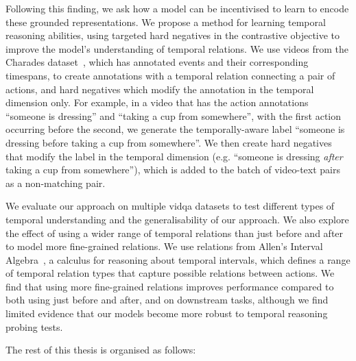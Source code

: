Following this finding, we ask how a model can be incentivised to learn to
encode these grounded representations. We propose a method for learning
temporal reasoning abilities, using targeted hard negatives in the contrastive
objective to improve the model's understanding of temporal relations. We use
videos from the Charades dataset~\cite{sigurdsson2016charades}, which has
annotated events and their corresponding timespans, to create annotations with
a temporal relation connecting a pair of actions, and hard negatives which
modify the annotation in the temporal dimension only. For example, in a video
that has the action annotations ``someone is dressing'' and ``taking a cup from
somewhere'', with the first action occurring before the second, we generate the
temporally-aware label ``someone is dressing before taking a cup from
somewhere''. We then create hard negatives that modify the label in the
temporal dimension (e.g. ``someone is dressing \textit{after} taking a cup from
somewhere''), which is added to the batch of video-text pairs as a non-matching
pair. 

We evaluate our approach on multiple \acrshort{vidqa} datasets to test
different types of temporal understanding and the generalisability of our
approach. We also explore the effect of using a wider range of temporal
relations than just before and after to model more fine-grained relations. We
use relations from Allen's Interval Algebra~\citep{allen1983interval}, a
calculus for reasoning about temporal intervals, which defines a range of
temporal relation types that capture possible relations between actions.  We
find that using more fine-grained relations improves performance compared to
both using just before and after, and on downstream tasks, although we find
limited evidence that our models become more robust to temporal reasoning
probing tests.

The rest of this thesis is organised as follows:

